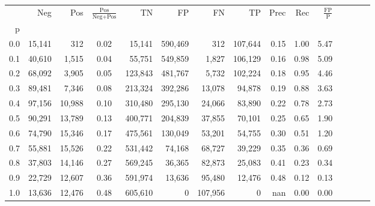 \begin{tabular}{rrrcrrrrrrrrrrr}
\toprule
{} &     Neg &     Pos & $\frac{\text{Pos}}{\text{Neg}+\text{Pos}}$ &       TN &       FP &       FN &       TP &  Prec &   Rec & $\frac{\text{FP}}{\text{P}}$ \\
p   &         &         &                                            &          &          &          &          &       &       &                              \\
\midrule
0.0 &  15,141 &     312 &                                       0.02 &   15,141 &  590,469 &      312 &  107,644 &  0.15 &  1.00 &                         5.47 \\
0.1 &  40,610 &   1,515 &                                       0.04 &   55,751 &  549,859 &    1,827 &  106,129 &  0.16 &  0.98 &                         5.09 \\
0.2 &  68,092 &   3,905 &                                       0.05 &  123,843 &  481,767 &    5,732 &  102,224 &  0.18 &  0.95 &                         4.46 \\
0.3 &  89,481 &   7,346 &                                       0.08 &  213,324 &  392,286 &   13,078 &   94,878 &  0.19 &  0.88 &                         3.63 \\
0.4 &  97,156 &  10,988 &                                       0.10 &  310,480 &  295,130 &   24,066 &   83,890 &  0.22 &  0.78 &                         2.73 \\
0.5 &  90,291 &  13,789 &                                       0.13 &  400,771 &  204,839 &   37,855 &   70,101 &  0.25 &  0.65 &                         1.90 \\
0.6 &  74,790 &  15,346 &                                       0.17 &  475,561 &  130,049 &   53,201 &   54,755 &  0.30 &  0.51 &                         1.20 \\
0.7 &  55,881 &  15,526 &                                       0.22 &  531,442 &   74,168 &   68,727 &   39,229 &  0.35 &  0.36 &                         0.69 \\
0.8 &  37,803 &  14,146 &                                       0.27 &  569,245 &   36,365 &   82,873 &   25,083 &  0.41 &  0.23 &                         0.34 \\
0.9 &  22,729 &  12,607 &                                       0.36 &  591,974 &   13,636 &   95,480 &   12,476 &  0.48 &  0.12 &                         0.13 \\
1.0 &  13,636 &  12,476 &                                       0.48 &  605,610 &        0 &  107,956 &        0 &   nan &  0.00 &                         0.00 \\
\bottomrule
\end{tabular}
